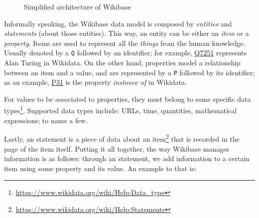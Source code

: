 \begin{figure}[h]
    \centering
    
    \caption[Simplified architecture of Wikibase]{Simplified architecture of Wikibase~\cite{https://doi.org/10.48550/arxiv.2110.11709}}
    \label{fig:architecture:wikibase}
\end{figure}

Informally speaking, the Wikibase data model is composed by \textit{entities} and \textit{statements} (about those entities). This way, an entity can be either an \textit{item} or a \textit{property}. Items are used to represent all the \textit{things} from the human knowledge. Usually denoted by a \texttt{Q} followed by an identifier; for example, \href{https://www.wikidata.org/wiki/Q7251}{Q7251} represents Alan Turing in Wikidata. On the other hand, properties model a relationship between an item and a value, and are represented by a \texttt{P} followed by its identifier; as an example, \href{https://www.wikidata.org/wiki/Property:P31}{P31} is the property \textit{instance of} in Wikidata.

For values to be associated to properties, they must belong to some specific data types\footnote{\url{https://www.wikidata.org/wiki/Help:Data_type}}. Supported data types include: URLs, time, quantities, mathematical expressions; to name a few.

Lastly, an statement is a piece of data about an item\footnote{\url{https://www.wikidata.org/wiki/Help:Statements}} that is recorded in the page of the item itself. Putting it all together, the way Wikibase manages information is as follows: through an statement, we add information to a certain item using some property and its value. An example to that is:

